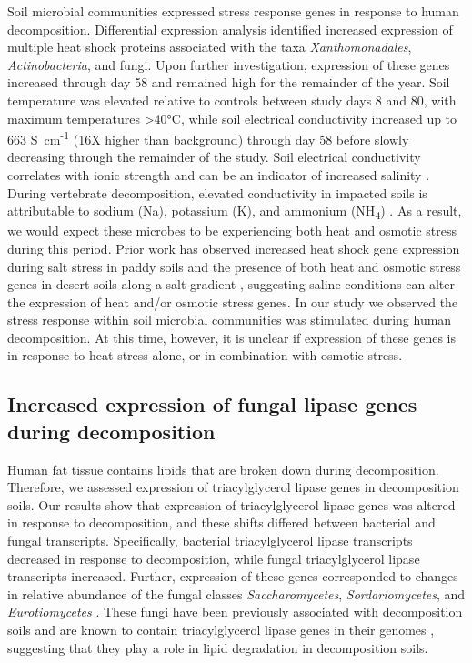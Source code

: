 \documentclass[
  sn-nature,
  lineno, referee]{sn-jnl}
\begin{document}
Soil microbial communities expressed stress response genes in response
to human decomposition. Differential expression analysis identified
increased expression of multiple heat shock proteins associated with the
taxa \emph{Xanthomonadales}, \emph{Actinobacteria}, and fungi. Upon
further investigation, expression of these genes increased through day
58 and remained high for the remainder of the year. Soil temperature was
elevated relative to controls between study days 8 and 80, with maximum
temperatures \textgreater40°C, while soil electrical conductivity
increased up to 663 \textmu S~cm\textsuperscript{-1} (16X higher than
background) through day 58 before slowly decreasing through the
remainder of the study. Soil electrical conductivity correlates with
ionic strength and can be an indicator of increased salinity
\citep{essington_soil_2015}. During vertebrate decomposition, elevated
conductivity in impacted soils is attributable to sodium (Na), potassium
(K), and ammonium (NH\textsubscript{4})
\citep{keenan_mortality_2018, fancher_evaluation_2017, quaggiotto_dynamic_2019, taylor_soil_2023, taylor_transient_2024}.
As a result, we would expect these microbes to be experiencing both heat
and osmotic stress during this period. Prior work has observed increased
heat shock gene expression during salt stress in paddy soils
\citep{peng_short-term_2017} and the presence of both heat and osmotic
stress genes in desert soils along a salt gradient
\citep{pandit_snapshot_2015}, suggesting saline conditions can alter the
expression of heat and/or osmotic stress genes. In our study we observed
the stress response within soil microbial communities was stimulated
during human decomposition. At this time, however, it is unclear if
expression of these genes is in response to heat stress alone, or in
combination with osmotic stress.

\subsection{Increased expression of fungal lipase genes during
decomposition}\label{increased-expression-of-fungal-lipase-genes-during-decomposition}

Human fat tissue contains lipids that are broken down during
decomposition. Therefore, we assessed expression of triacylglycerol
lipase genes in decomposition soils. Our results show that expression of
triacylglycerol lipase genes was altered in response to decomposition,
and these shifts differed between bacterial and fungal transcripts.
Specifically, bacterial triacylglycerol lipase transcripts decreased in
response to decomposition, while fungal triacylglycerol lipase
transcripts increased. Further, expression of these genes corresponded
to changes in relative abundance of the fungal classes
\emph{Saccharomycetes}, \emph{Sordariomycetes}, and
\emph{Eurotiomycetes} \citep{taylor_transient_2024}. These fungi have
been previously associated with decomposition soils
\citep{metcalf_microbial_2016, fu_fungal_2019} and are known to contain
triacylglycerol lipase genes in their genomes
\citep{dujon_genome_2004, haridas_genome_2013}, suggesting that they
play a role in lipid degradation in decomposition soils.
\end{document}
